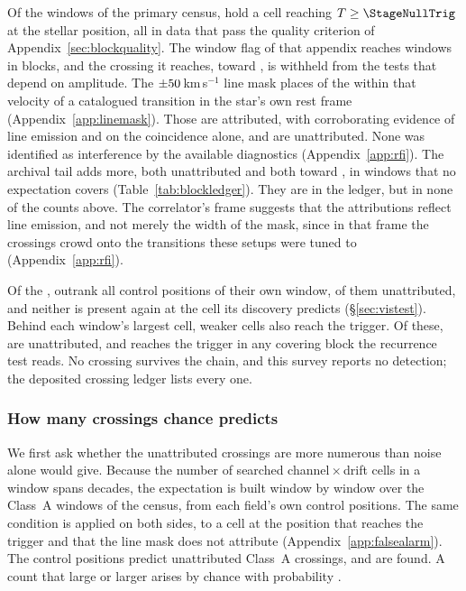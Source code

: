 Of the \NWindows{} windows of the primary census, \CsNCross{} hold a cell
reaching $T\geq\StageNullTrig$ at the stellar position, all in data that pass
the quality criterion of Appendix~\ref{sec:blockquality}. The window flag of
that appendix reaches \DqNWin{} windows in \BkFlagNBlock{} blocks, and the
\BkFlagNCrossOther{} crossing it reaches, toward \BkFlagOtherStar, is
withheld from the tests that depend on amplitude. The
$\pm50$\,km\,s$^{-1}$ line mask places \MkNCoinc{} of the
\CsNCrossQp{} within that velocity of a catalogued transition in the star's
own rest frame (Appendix~\ref{app:linemask}). Those \CsNAttrQp{} are
attributed, \LnAttrSupp{} with corroborating evidence of line emission and
\LnAttrCoinc{} on the coincidence alone, and \CsNUnattrQp{} are
unattributed. None was identified as interference by the available
diagnostics (Appendix~\ref{app:rfi}). The archival tail adds
\CeNTailCrossWord{} more, both unattributed and both toward \CeTailStar, in
windows that no expectation covers (Table~\ref{tab:blockledger}). They are in
the ledger, but in none of the counts above. The correlator's frame
suggests that the attributions reflect line emission, and not merely the
width of the mask, since in that frame the crossings crowd onto the
transitions these setups were tuned to (Appendix~\ref{app:rfi}).

Of the \CsNCrossQp, \EvNLeadWord{} outrank all \NCtrl{} control positions of
their own window, \EvNRankQp{} of them unattributed, and neither is present
again at the cell its discovery predicts (\S\ref{sec:vistest}). Behind each
window's largest cell, \CkNSecondaryWord{} weaker cells also reach the
trigger. Of these, \CkNSecUnattrWord{} are unattributed, and \CkNRecurWord{} reaches the
trigger in any covering block the recurrence test reads. No crossing
survives the chain, and this survey reports no detection; the deposited
crossing ledger lists every one.

\subsubsection{How many crossings chance predicts}
\label{sec:trigunif}

We first ask whether the unattributed crossings are more numerous than
noise alone would give. Because the number of searched
channel\,$\times$\,drift cells in a window spans \TuCellsDecades{} decades,
the expectation is built window by window over the \CeNWin{} Class~A windows
of the census, from each field's own control positions. The same condition
is applied on both sides, to a cell at the position that reaches the trigger
and that the line mask does not attribute (Appendix~\ref{app:falsealarm}). The
control positions predict \CeExp{} unattributed Class~A crossings, and
\CeObs{} are found. A count that large or larger arises by chance with
probability \CeProbNull.

